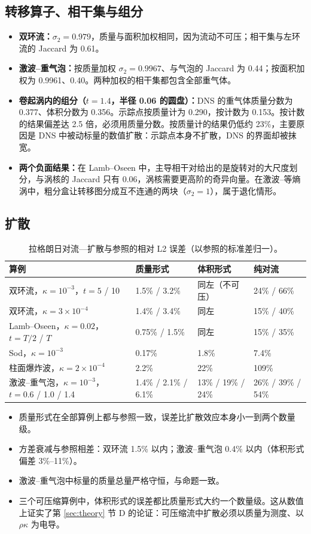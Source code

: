 \documentclass[10.5pt,a4paper]{article}
\begin{document}
\subsection{转移算子、相干集与组分}
\begin{itemize}
\item \textbf{双环流：}$\sigma_2=0.979$，质量与面积加权相同，因为流动不可压；相干集与左环流的 Jaccard 为 0.61。
\item \textbf{激波–重气泡：}按质量加权 $\sigma_2=0.9967$、与气泡的 Jaccard 为 0.44；按面积加权为 0.9961、0.40。两种加权的相干集都包含全部重气体。
\item \textbf{卷起涡内的组分（$t=1.4$，半径 0.06 的圆盘）：}DNS 的重气体质量分数为 0.377、体积分数为 0.356。示踪点按质量计为 0.290，按计数为 0.153。按计数的结果偏差达 2.5 倍，必须用质量分数。按质量计的结果仍低约 23\%，主要原因是 DNS 中被动标量的数值扩散：示踪点本身不扩散，DNS 的界面却被抹宽。
\item \textbf{两个负面结果：}在 Lamb–Oseen 中，主导相干对给出的是旋转对的大尺度划分，与涡核的 Jaccard 只有 0.06，涡核需要更高阶的奇异向量。在激波–等熵涡中，粗分盒让转移图分成互不连通的两块（$\sigma_2=1$），属于退化情形。
\end{itemize}

\subsection{扩散}
\begin{table}[H]\centering\small
\caption{拉格朗日对流—扩散与参照的相对 L2 误差（以参照的标准差归一）。}
\begin{tabularx}{\linewidth}{@{}lYYY@{}}\toprule
算例 & 质量形式 & 体积形式 & 纯对流 \\\midrule
双环流，$\kappa=10^{-3}$，$t=5$ / 10 & 1.5\% / 3.2\% & 同左（不可压） & 24\% / 66\% \\
双环流，$\kappa=3\times10^{-4}$ & 1.4\% / 3.4\% & 同左 & 15\% / 40\% \\
Lamb–Oseen，$\kappa=0.02$，$t=T/2$ / $T$ & 0.75\% / 1.5\% & 同左 & 15\% / 35\% \\
Sod，$\kappa=10^{-3}$ & 0.17\% & 1.8\% & 7.4\% \\
柱面爆炸波，$\kappa=2\times10^{-4}$ & 2.2\% & 22\% & 109\% \\
激波–重气泡，$\kappa=10^{-3}$，$t=0.6$ / 1.0 / 1.4 & 1.4\% / 2.1\% / 6.1\% & 13\% / 19\% / 24\% & 26\% / 39\% / 54\% \\
\bottomrule\end{tabularx}
\end{table}
\begin{itemize}
\item 质量形式在全部算例上都与参照一致，误差比扩散效应本身小一到两个数量级。
\item 方差衰减与参照相差：双环流 1.5\% 以内；激波–重气泡 0.4\% 以内（体积形式偏差 3\%–11\%）。
\item 激波–重气泡中标量的质量总量严格守恒，与命题一致。
\item 三个可压缩算例中，体积形式的误差都比质量形式大约一个数量级。这从数值上证实了第 \ref{sec:theory} 节 D 的论证：可压缩流中扩散必须以质量为测度、以 $\rho\kappa$ 为电导。
\end{itemize}
\end{document}
